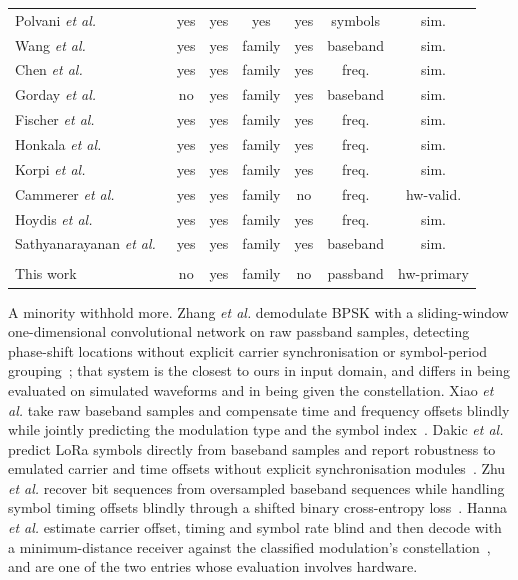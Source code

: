 \documentclass[journal]{IEEEtran}   %
\begin{document}
\begin{table}[!t]
\begin{tabular}{lcccccc}
Polvani \textit{et al.}~\cite{polvani2021MIMO} & yes & yes & yes & yes & symbols & sim. \\
Wang \textit{et al.}~\cite{wang2024optimalSequence} & yes & yes & family & yes & baseband & sim. \\
Chen \textit{et al.}~\cite{chen2024robustSymboldetection} & yes & yes & family & yes & freq. & sim. \\
Gorday \textit{et al.}~\cite{gorday2020complexNN} & no & yes & family & yes & baseband & sim. \\
Fischer \textit{et al.}~\cite{fischer2022OFDM} & yes & yes & family & yes & freq. & sim. \\
Honkala \textit{et al.}~\cite{honkala2021deeprxfullyconvolutionaldeep} & yes & yes & family & yes & freq. & sim. \\
Korpi \textit{et al.}~\cite{korpi2021UplinkCNN} & yes & yes & family & yes & freq. & sim. \\
Cammerer \textit{et al.}~\cite{cammerer2020trainableCS} & yes & yes & family & no & freq. & hw-valid. \\
Hoydis \textit{et al.}~\cite{hoydis2021nativeAirInterface} & yes & yes & family & yes & freq. & sim. \\
Sathyanarayanan \textit{et al.}~\cite{satyanarayan2023RML} & yes & yes & family & yes & baseband & sim. \\ \\
This work & no & yes & family & no & passband & hw-primary \\
\bottomrule
\end{tabular}
\end{table}

A minority withhold more. Zhang \textit{et al.} demodulate BPSK with a
sliding-window one-dimensional convolutional network on raw passband samples,
detecting phase-shift locations without explicit carrier synchronisation or
symbol-period grouping~\cite{Zhang2018Enhanced}; that system is the closest to
ours in input domain, and differs in being evaluated on simulated waveforms and
in being given the constellation. Xiao \textit{et al.} take raw baseband samples
and compensate time and frequency offsets blindly while jointly predicting the
modulation type and the symbol index~\cite{Xiao2023_UnifiedDeep}. Dakic
\textit{et al.} predict LoRa symbols directly from baseband samples and report
robustness to emulated carrier and time offsets without explicit synchronisation
modules~\cite{dakic2021LoRa}. Zhu \textit{et al.} recover bit sequences from
oversampled baseband sequences while handling symbol timing offsets blindly
through a shifted binary cross-entropy loss~\cite{Zhu2022EndtoEnd}. Hanna
\textit{et al.} estimate carrier offset, timing and symbol rate blind and then
decode with a minimum-distance receiver against the classified modulation's
constellation~\cite{Hanna2022SignalProcessing}, and are one of the two entries
whose evaluation involves hardware.
\end{document}
